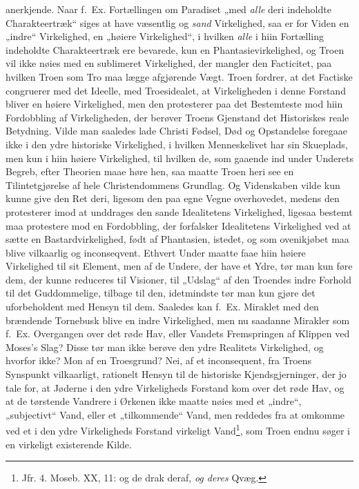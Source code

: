 \documentclass[12pt,a4paper]{book}
\newcommand{\opage}[1]{\marginnote{\footnotesize\textit{[#1]}}}
\begin{document}
anerkjende. Naar f.\ Ex. Fortællingen om Paradiset „med \emph{alle} deri indeholdte Charakteertræk“
siges at have væsentlig og \emph{sand} Virkelighed, saa er for Viden en „indre“ Virkelighed, en
„høiere Virkelighed“, i hvilken \emph{alle} i hiin Fortælling indeholdte Charakteertræk ere bevarede,
kun en Phantasievirkelighed, og Troen vil ikke nøies med en sublimeret Virkelighed, der mangler
den Facticitet, paa hvilken Troen som Tro maa lægge afgjørende Vægt. Troen fordrer, at det
Factiske congruerer med det Ideelle, med Troesidealet, at Virkeligheden i denne Forstand bliver
en høiere Virkelighed, men den protesterer paa det Bestemteste mod hiin Fordobbling af
Virkeligheden, der berøver Troens Gjenstand det Historiskes reale Betydning. Vilde man saaledes
lade Christi Fødsel, Død og Opstandelse foregaae ikke i den ydre historiske Virkelighed, i
hvilken Menneskelivet har sin Skueplads, men kun i hiin høiere Virkelighed, til hvilken de, som
gaaende ind under Underets Begreb, efter Theorien maae høre hen, saa maatte Troen heri see en
Tilintetgjørelse af hele Christendommens Grundlag. Og Videnskaben vilde kun kunne give den Ret
deri, ligesom den paa egne Vegne overhovedet, medens den protesterer imod at unddrages den
sande Idealitetens Virkelighed, ligesaa bestemt maa protestere mod en Fordobbling, der
forfalsker Idealitetens Virkelighed ved at sætte en Bastardvirkelighed, født af Phantasien,
istedet, og som ovenikjøbet maa blive vilkaarlig og inconseqvent. Ethvert Under maatte faae
hiin høiere Virkelighed til sit Element, men af de Undere, der have et Ydre, tør man kun føre
dem, der kunne reduceres til Visioner, til „Udslag“ af den Troendes indre Forhold til det
Guddommelige, tilbage til den, idetmindste tør man kun gjøre det uforbeholdent med Hensyn til
dem. Saaledes kan f.\ Ex. Miraklet med den brændende Tornebusk blive en indre Virkelighed, men
nu saadanne Mirakler som f.\ Ex. Overgangen over det røde Hav, eller Vandets Fremspringen af
Klippen ved Moses's Slag? Disse tør man ikke berøve den ydre Realitets Virkelighed, og hvorfor
ikke? Mon af en Troesgrund? Nei, af et inconsequent, fra Troens Syns\opage{193}punkt vilkaarligt, rationelt
Hensyn til de historiske Kjendsgjerninger, der jo tale for, at Jøderne i den ydre Virkeligheds
Forstand kom over det røde Hav, og at de tørstende Vandrere i Ørkenen ikke maatte nøies med et
„indre“, „subjectivt“ Vand, eller et „tilkommende“ Vand, men reddedes fra at omkomme ved et i
den ydre Virkeligheds Forstand virkeligt Vand\footnote{Jfr. 4. Moseb. XX, 11: og de drak
deraf, \emph{og deres} Qvæg.}, som Troen endnu søger i en virkeligt existerende Kilde.
\end{document}
